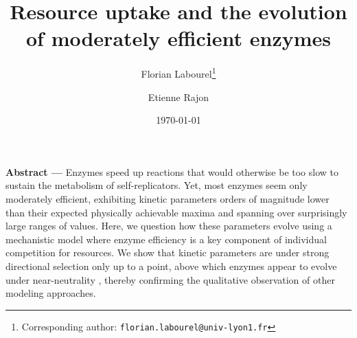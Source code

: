 \documentclass[11pt,onecolumn]{article}
\renewcommand{\abstract}[1]{\textbf{Abstract --- } #1}
\providecommand{\DIFadd}[1]{{\protect\color{blue} \sf #1}} %
\providecommand{\DIFaddbegin}{} %
\providecommand{\DIFaddend}{} %
\begin{document}
\title{Resource uptake and the evolution of moderately efficient enzymes}
\date{\today}
\author[,1]{Florian Labourel\thanks{Corresponding author: \texttt{florian.labourel@univ-lyon1.fr}}}
\author[1]{Etienne Rajon}

 

  \maketitle

    \abstract{Enzymes speed up reactions that would otherwise be too slow to sustain the metabolism of self-replicators. 
Yet, most enzymes seem only moderately efficient, exhibiting kinetic parameters orders of magnitude lower than their expected physically achievable maxima \DIFaddbegin \DIFadd{and spanning over surprisingly large ranges of values}\DIFaddend . Here, we question how these parameters evolve using a mechanistic model where enzyme efficiency is a key component of individual competition for resources. We show that kinetic parameters are under strong directional selection only up to a point, above which enzymes appear to evolve under near-neutrality\DIFaddbegin \DIFadd{, thereby confirming the qualitative observation of other modeling approaches}\DIFaddend . 
}
\end{document}
